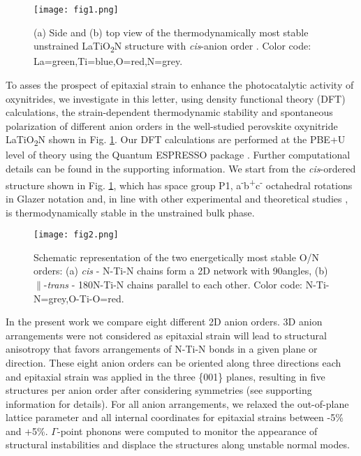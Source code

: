 \documentclass[prl,reprint,aps,twocolumn]{revtex4-1}
\newcommand{\SI}[1]{{#1}}
\begin{document}
\begin{figure}
\centering
\texttt{[image: fig1.png]}
\caption{(a) Side and (b) top view of the thermodynamically most stable unstrained LaTiO\textsubscript{2}N structure with \textit{cis}-anion order \cite{ninova2017surface}. Color code: La=green,Ti=blue,O=red,N=grey.}
\label{fig:cell}
\end{figure}

To asses the prospect of epitaxial strain to enhance the photocatalytic activity of oxynitrides, we investigate in this letter, using density functional theory (DFT) calculations, the strain-dependent thermodynamic stability and spontaneous polarization of different anion orders in the well-studied perovskite oxynitride LaTiO\textsubscript{2}N shown in Fig. \ref{fig:cell}. Our DFT calculations are performed at the PBE+U level of theory \cite{perdew1996generalized, anisimov1991band} using the Quantum ESPRESSO package \cite{giannozzi2009quantum}. Further computational details can be found in the \SI{supporting information}. We start from the \textit{cis}-ordered structure \cite{ninova2017surface} shown in Fig. \ref{fig:cell}, which has space group P1, a\textsuperscript{-}b\textsuperscript{+}c\textsuperscript{-} octahedral rotations in Glazer notation \cite{Glazer:1972eb} and, in line with other experimental and theoretical studies \cite{yashima2010imma, wang2015hybrid, kasahara2003latio2n}, is thermodynamically stable in the unstrained bulk phase. 

\begin{figure}
\centering
\texttt{[image: fig2.png]}
\caption{Schematic representation of the two energetically most stable O/N orders: (a) \textit{cis} - N-Ti-N chains form a 2D network with 90\textdegree angles, (b) $\parallel$-\textit{trans} -
 180\textdegree N-Ti-N chains parallel to each other.
Color code: N-Ti-N=grey,O-Ti-O=red.}
\label{fig:anion-ordering}
\end{figure}

In the present work we compare eight different 2D anion orders. 3D anion arrangements were not considered as epitaxial strain will lead to structural anisotropy that favors arrangements of N-Ti-N bonds in a given plane or direction. These eight anion orders can be oriented along three directions each and epitaxial strain was applied in the three \{001\} planes, resulting in five structures per anion order after considering symmetries (see \SI{supporting information} for details). For all anion arrangements, we relaxed the out-of-plane lattice parameter and all internal coordinates for epitaxial strains between -5\% and +5\%. $\Gamma$-point phonons were computed to monitor the appearance of structural instabilities and displace the structures along unstable normal modes.
\end{document}
